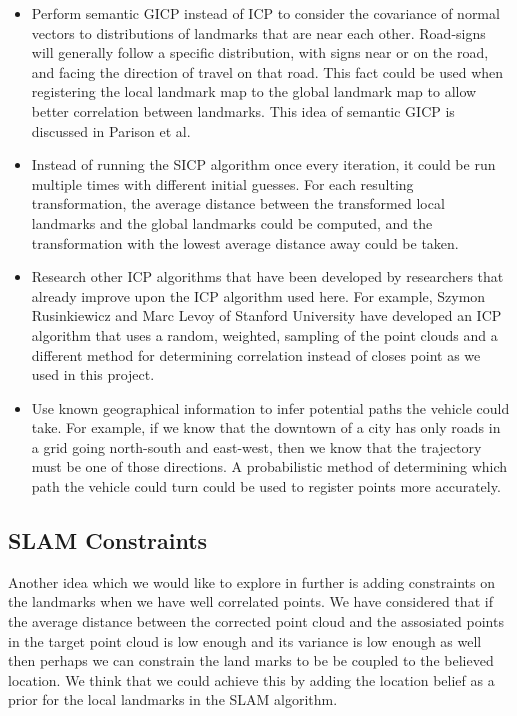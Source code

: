 \documentclass[letterpaper, 10 pt, conference]{ieeeconf}  %
\begin{document}
\begin{itemize}
\item Perform semantic GICP instead of ICP to consider the covariance of normal vectors to distributions of landmarks that are near each other. Road-signs will generally follow a specific distribution, with signs near or on the road, and facing the direction of travel on that road. This fact could be used when registering the local landmark map to the global landmark map to allow better correlation between landmarks. This idea of semantic GICP is discussed in Parison et al. \cite{cGICP}
\item Instead of running the SICP algorithm once every iteration, it could be run multiple times with different initial guesses. For each resulting transformation, the average distance between the transformed local landmarks and the global landmarks could be computed, and the transformation with the lowest average distance away could be taken.
\item Research other ICP algorithms that have been developed by researchers that already improve upon the ICP algorithm used here. For example, Szymon Rusinkiewicz and Marc Levoy of Stanford University \cite{ref:futurework} have developed an ICP algorithm that uses a random, weighted, sampling of the point clouds and a different method for determining correlation instead of closes point as we used in this project.
\item Use known geographical information to infer potential paths the vehicle could take. For example, if we know that the downtown of a city has only roads in a grid going north-south and east-west, then we know that the trajectory must be one of those directions. A probabilistic method of determining which path the vehicle could turn could be used to register points more accurately.
\end{itemize}

\subsection{SLAM Constraints}
Another idea which we would like to explore in further is adding constraints on the landmarks when we have well correlated points.  We have considered that if the average distance between the corrected point cloud and the assosiated points in the target point cloud is low enough and its variance is low enough as well then perhaps we can constrain the land marks to be be  coupled to the believed location.  We think that we could achieve this by adding the location belief as a prior for the local landmarks in the SLAM algorithm.
\end{document}
